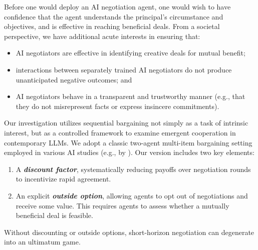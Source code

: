 \documentclass{article}
\theoremstyle{plain}
\theoremstyle{definition}
\theoremstyle{remark}
\newcommand{\term}[1]{\textbf{\textit{#1}}}
\begin{document}
Before one would deploy an AI negotiation agent, one would wish to have confidence that the agent understands the principal's circumstance and objectives, and is effective in reaching beneficial deals.
From a societal perspective, we have additional acute interests in ensuring that:
\begin{itemize}
\item AI negotiators are effective in identifying creative deals for mutual benefit;
\item interactions between separately trained AI negotiators do not produce unanticipated negative outcomes;
and
    \item AI negotiators behave in a transparent and trustworthy manner (e.g., that they do not misrepresent facts or express insincere commitments).
\end{itemize}

Our investigation utilizes sequential bargaining not simply as a task of intrinsic interest, but as a controlled framework to examine emergent cooperation in contemporary LLMs. 
We adopt a classic two-agent multi-item bargaining setting employed in various AI studies (e.g., by \citet{Lewis17}).
Our version includes two key elements:
\begin{enumerate}
\item A \term{discount factor}, systematically reducing payoffs over negotiation rounds to incentivize rapid agreement.
\item An explicit \term{outside option}, allowing agents to opt out of negotiations and receive some value.
This requires agents to assess whether a mutually beneficial deal is feasible.
\end{enumerate}
Without discounting or outside options, short-horizon negotiation can degenerate into an ultimatum game.

\end{document}
